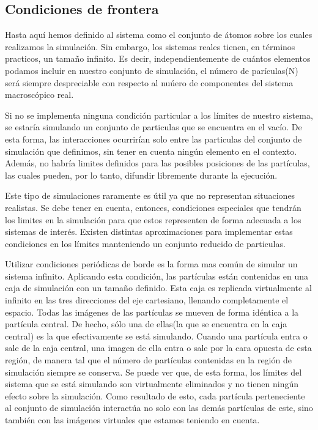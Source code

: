 \subsection{Condiciones de frontera}

Hasta aquí hemos definido al sistema como el conjunto de átomos sobre los cuales realizamos la simulación. 
Sin embargo, los sistemas reales tienen, en términos practicos, un tamaño infinito. 
Es decir, independientemente de cuántos elementos podamos incluir en nuestro conjunto de simulación, el número de parículas(N) será siempre despreciable con respecto al nuúero de componentes del sistema macroscópico real.

Si no se implementa ninguna condición particular a los límites de nuestro sistema, se estaría simulando un conjunto de particulas que se encuentra en el vacío. 
De esta forma, las interacciones ocurrirían solo entre las particulas del conjunto de simulación que definimos, sin tener en cuenta ningún elemento en el contexto.
Además, no habría limites definidos para las posibles posiciones de las partículas, las cuales pueden, por lo tanto, difundir libremente durante la ejecución.

Este tipo de simulaciones raramente es útil ya que no representan situaciones realistas. Se debe tener en cuenta, entonces, condiciones especiales que tendrán los limites en la simulación para que estos representen de forma adecuada a los sistemas de interés.
Existen distintas aproximaciones para implementar estas condiciones en los límites manteniendo un conjunto reducido de particulas. 

Utilizar condiciones periódicas de borde es la forma mas común de simular un sistema infinito. Aplicando esta condición, las partículas están contenidas en una caja de simulación con un tamaño definido. 
Esta caja es replicada virtualmente al infinito en las tres direcciones del eje cartesiano, llenando completamente el espacio.
Todas las imágenes de las partículas se mueven de forma idéntica a la partícula central. De hecho, sólo una de ellas(la que se encuentra en la caja central) es la que efectivamente se está simulando.
Cuando una partícula entra o sale de la caja central, una imagen de ella entra o sale por la cara opuesta de esta región, de manera tal que el número de partículas contenidas en la región de simulación siempre se conserva.
Se puede ver que, de esta forma, los límites del sistema que se está simulando son virtualmente eliminados y no tienen ningún efecto sobre la simulación.
Como resultado de esto, cada partícula perteneciente al conjunto de simulación interactúa no solo con las demás partículas de este, sino también con las imágenes virtuales que estamos teniendo en cuenta.

